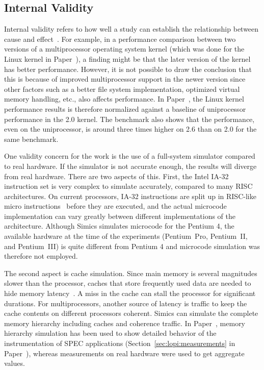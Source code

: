 \subsection{Internal Validity}
Internal validity refers to how well a study can establish the relationship
between cause and effect~\cite[page 103]{robson02realworld}. For example, in a
performance comparison between two versions of a multiprocessor operating
system kernel (which was done for the Linux kernel in
Paper~), a finding might be that the later version of the
kernel has better performance.  However, it is not possible to draw the
conclusion that this is because of improved multiprocessor support in the
newer version since other factors such as a better file system implementation,
optimized virtual memory handling, etc., also affects performance. In
Paper~, the Linux kernel performance results is therefore
normalized against a baseline of uniprocessor performance in the 2.0 kernel.
The benchmark also shows that the performance, even on the uniprocessor, is
around three times higher on 2.6 than on 2.0 for the same benchmark.

One validity concern for the work is the use of a full-system simulator
compared to real hardware. If the simulator is not accurate enough, the
results will diverge from real hardware. There are two aspects of this. First,
the Intel IA-32 instruction set is very complex to simulate accurately,
compared to many RISC architectures. On current processors, IA-32 instructions
are split up in RISC-like micro instructions~\cite{intel02sdm1} before they
are executed, and the actual microcode implementation can vary greatly between
different implementations of the architecture. Although Simics simulates
microcode for the Pentium 4, the available hardware at the time of the
experiments (Pentium~Pro, Pentium~II, and Pentium~III) is quite different from
Pentium 4 and microcode simulation was therefore not employed.

The second aspect is cache simulation. Since main memory is several magnitudes
slower than the processor, caches that store frequently used data are needed
to hide memory latency~\cite{hennessy03computer}. A miss in the cache can
stall the processor for significant durations. For multiprocessors, another
source of latency is traffic to keep the cache contents on different
processors coherent. Simics can simulate the complete memory hierarchy
including caches and coherence traffic. In Paper~, memory hierarchy
simulation has been used to show detailed behavior of the instrumentation of
SPEC applications (Section~\ref{sec:lopi:measurements} in
Paper~), whereas measurements on real hardware were used to
get aggregate values.

